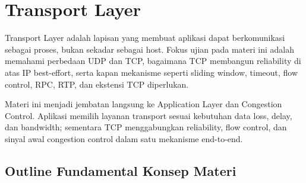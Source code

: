 \section{Transport Layer}

Transport Layer adalah lapisan yang membuat aplikasi dapat berkomunikasi sebagai proses, bukan sekadar sebagai host. Fokus ujian pada materi ini adalah memahami perbedaan UDP dan TCP, bagaimana TCP membangun reliability di atas IP best-effort, serta kapan mekanisme seperti sliding window, timeout, flow control, RPC, RTP, dan ekstensi TCP diperlukan.

Materi ini menjadi jembatan langsung ke Application Layer dan Congestion Control. Aplikasi memilih layanan transport sesuai kebutuhan data loss, delay, dan bandwidth; sementara TCP menggabungkan reliability, flow control, dan sinyal awal congestion control dalam satu mekanisme end-to-end.

\subsection{Outline Fundamental Konsep Materi}

